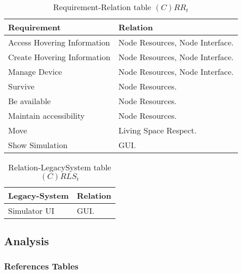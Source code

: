 \begin{table}[H]
	\centering
	\begin{tabular}{|p{4cm}|p{8cm}|}
			\hline
			\textbf{Requirement} & \textbf{Relation} \\
			\hline
			Access Hovering Information & Node Resources, Node Interface.  \\
			\hline
			Create Hovering Information & Node Resources, Node Interface.  \\
			\hline
			Manage Device & Node Resources, Node Interface.  \\
			\hline
			Survive & Node Resources. \\
			\hline
			Be available & Node Resources. \\
			\hline
			Maintain accessibility & Node Resources. \\
			\hline
			Move & Living Space Respect. \\
			\hline
			Show Simulation & GUI. \\
			\hline
		\end{tabular}
	\caption{Requirement-Relation table $(C)RR_t$}
	\label{tab:crrt}
\end{table}

\begin{table}[H]
	\centering
	\begin{tabular}{|p{4cm}|p{8cm}|}
			\hline
			\textbf{Legacy-System} & \textbf{Relation} \\
			\hline
			Simulator UI & GUI. \\
			\hline
		\end{tabular}
	\caption{Relation-LegacySystem table $(C)RLS_t$}
	\label{tab:crlst}
\end{table}


\subsection{Analysis}

\subsubsection{References Tables}

